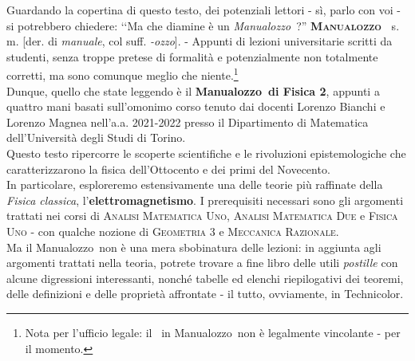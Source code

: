 \noindent Guardando la copertina di questo testo, dei potenziali lettori - sì, parlo con voi - si potrebbero chiedere: ‘‘Ma che diamine è un \textit{Manualozzo\texttrademark\ }?''
\vspace{3mm}
\lettrine[findent=1pt, nindent=0pt]{\textbf{M}}{\textbf{anualozzo\texttrademark\ }} s. m. [der. di \textit{manuale}, col suff. \textit{-ozzo}]. - Appunti di lezioni universitarie scritti da studenti, senza troppe pretese di formalità e potenzialmente non totalmente corretti, ma sono comunque meglio che niente.\footnote{Nota per l'ufficio legale: il \texttrademark\ in Manualozzo\texttrademark\ non è legalmente vincolante - per il momento.}
\vspace{3mm}\\
Dunque, quello che state leggendo è il \textbf{Manualozzo\texttrademark\  di Fisica 2}, appunti a quattro mani basati sull'omonimo corso tenuto dai docenti Lorenzo Bianchi e Lorenzo Magnea nell'a.a. 2021-2022 presso il Dipartimento di Matematica dell'Università degli Studi di Torino.\\
Questo testo ripercorre le scoperte scientifiche e le rivoluzioni epistemologiche che caratterizzarono la fisica dell'Ottocento e dei primi del Novecento.\\
In particolare, esploreremo estensivamente una delle teorie più raffinate della \textit{Fisica classica}, l'\textbf{elettromagnetismo}.
I prerequisiti necessari sono gli argomenti trattati nei corsi di \textsc{Analisi Matematica Uno}, \textsc{Analisi Matematica Due} e \textsc{Fisica Uno} - con qualche nozione di \textsc{Geometria 3} e \textsc{Meccanica Razionale}.\\
Ma il Manualozzo\texttrademark\ non è una mera sbobinatura delle lezioni: in aggiunta agli argomenti trattati nella teoria, potrete trovare a fine libro delle utili \textit{postille} con alcune digressioni interessanti, nonché tabelle ed elenchi riepilogativi dei teoremi, delle definizioni e delle proprietà affrontate - il tutto, ovviamente, in Technicolor\texttrademark.\\%

